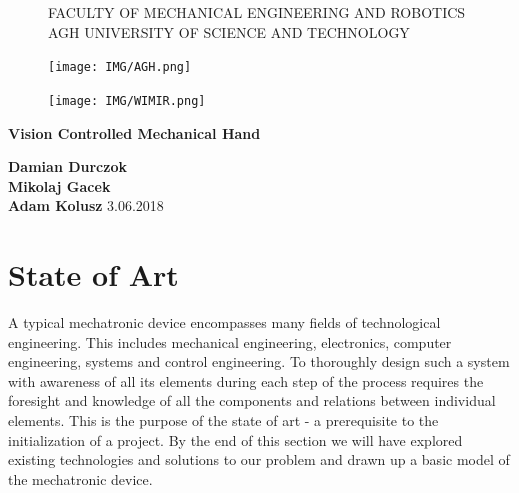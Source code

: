 \documentclass{article}
\begin{document}
\begin{titlepage}
    \begin{center}
        
	\begin{figure}
		\centering
        FACULTY OF MECHANICAL ENGINEERING AND ROBOTICS\\
        AGH UNIVERSITY OF SCIENCE AND TECHNOLOGY\\
        \vspace{0.2cm}
    	\begin{minipage}[b]{0.4\textwidth}
    	    \centering
    		\texttt{[image: IMG/AGH.png]}
    	\end{minipage}
    	\hfill
    	\begin{minipage}[b]{0.4\textwidth}
	    	\centering
    		\texttt{[image: IMG/WIMIR.png]}
		\end{minipage}
		\vspace{1cm}
    \end{figure}

    \Huge \textbf{Vision Controlled Mechanical Hand}
        
    \vspace{0.8cm}
    \LARGE 
    \color{black} 
            
    \vspace{0.8cm}       
    \textbf{Damian Durczok\\Mikolaj Gacek\\Adam Kolusz}        
    \vfill       
    \vspace{0.8cm}    
    3.06.2018
        
    \end{center}
\end{titlepage}

\tableofcontents
\break

\section{State of Art}
A typical mechatronic device encompasses many fields of technological engineering. This includes mechanical engineering, electronics, computer engineering, systems and control engineering. To thoroughly design such a system with awareness of all its elements during each step of the process requires the foresight and knowledge of all the components and relations between individual elements. This is the purpose of the state of art - a prerequisite to the initialization of a project. By the end of this section we will have explored existing technologies and solutions to our problem and drawn up a basic model of the mechatronic device.
\end{document}
